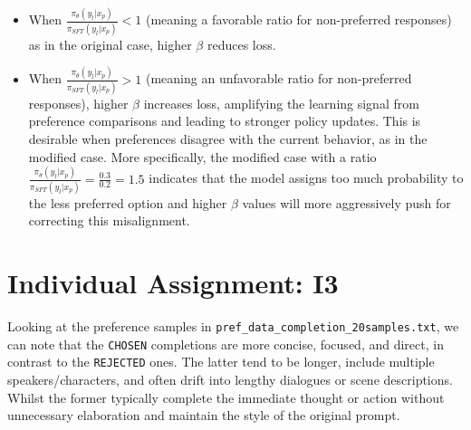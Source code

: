 \documentclass{article}
\begin{document}
\begin{itemize}
    \item When $\frac{\pi_\theta(y_l|x_p)}{\pi_{SFT}(y_l|x_p)} < 1$ (meaning a favorable ratio for non-preferred responses) as in the original case, higher $\beta$ reduces loss.
    \item When $\frac{\pi_\theta(y_l|x_p)}{\pi_{SFT}(y_l|x_p)} > 1$ (meaning an unfavorable ratio for non-preferred responses), higher $\beta$ increases loss, amplifying the learning signal from preference comparisons and leading to stronger policy updates. This is desirable when preferences disagree with the current behavior, as in the modified case. More specifically, the modified case with a ratio $\frac{\pi_\theta(y_l|x_p)}{\pi_{SFT}(y_l|x_p)} = \frac{0.3}{0.2} = 1.5$ indicates that the model assigns too much probability to the less preferred option and higher $\beta$ values will more aggressively push for correcting this misalignment.
\end{itemize}

\clearpage 

\section{Individual Assignment: I3}\label{sec:i3}

Looking at the preference samples in \texttt{pref\_data\_completion\_20samples.txt}, we can note that the \texttt{CHOSEN} completions are more concise, focused, and direct, in contrast to the \texttt{REJECTED} ones. The latter tend to be longer, include multiple speakers/characters, and often drift into lengthy dialogues or scene descriptions. Whilst the former typically complete the immediate thought or action without unnecessary elaboration and maintain the style of the original prompt.
\end{document}
